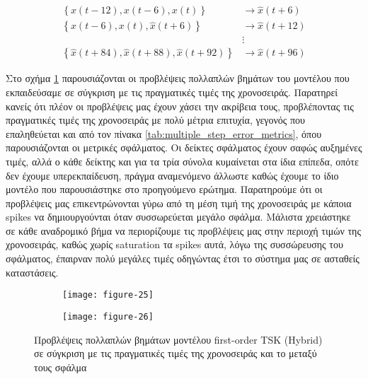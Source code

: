 \documentclass[11pt,a4paper,titlepage, oneside]{article}
\newlength\figureheight
\newlength\figurewidth
\begin{document}
		\begin{align*}
			\left\{ x(t-12), x(t-6), x(t)\right\} & \rightarrow \hat{x}(t+6) \\
			\left\{ x(t-6), x(t), \hat{x}(t+6) \right\} & \rightarrow \hat{x}(t+12) \\
			& \vdots \\
			\left\{ \hat{x}(t+84), \hat{x}(t+88), \hat{x}(t+92) \right\} & \rightarrow \hat{x}(t+96)
		\end{align*}

 		Στο σχήμα \ref{fig:multiple_step_predictions} παρουσιάζονται οι προβλέψεις πολλαπλών βημάτων του μοντέλου που εκπαιδεύσαμε σε σύγκριση με τις πραγματικές τιμές της χρονοσειράς. Παρατηρεί κανείς ότι πλέον οι προβλέψεις μας έχουν χάσει την ακρίβεια τους, προβλέποντας τις πραγματικές τιμές της χρονοσειράς με πολύ μέτρια επιτυχία, γεγονός που επαληθεύεται και από τον πίνακα \ref{tab:multiple_step_error_metrics}, όπου παρουσιάζονται οι μετρικές σφάλματος. Οι δείκτες σφάλματος έχουν σαφώς αυξημένες τιμές, αλλά ο κάθε δείκτης και για τα τρία σύνολα κυμαίνεται στα ίδια επίπεδα, οπότε δεν έχουμε υπερεκπαίδευση, πράγμα αναμενόμενο άλλωστε καθώς έχουμε το ίδιο μοντέλο που παρουσιάστηκε στο προηγούμενο ερώτημα. Παρατηρούμε ότι οι προβλέψεις μας επικεντρώνονται γύρω από τη μέση τιμή της χρονοσειράς με κάποια spikes να δημιουργούνται όταν συσσωρεύεται μεγάλο σφάλμα. Μάλιστα χρειάστηκε σε κάθε αναδρομικό βήμα να περιορίζουμε τις προβλέψεις μας στην περιοχή τιμών της χρονοσειράς, καθώς χωρίς saturation τα spikes αυτά, λόγω της συσσώρευσης του σφάλματος, έπαιρναν πολύ μεγάλες τιμές οδηγώντας έτσι το σύστημα μας σε ασταθείς καταστάσεις.

 		\begin{figure}[]
			 	\setlength{}
				\setlength{}	
				\centering
				\begin{subfigure}[b]{0.49\textwidth}
					\texttt{[image: figure-25]}
				\end{subfigure}
				\begin{subfigure}[b]{0.49\textwidth}
					\texttt{[image: figure-26]}
				\end{subfigure}
				\caption{Προβλέψεις πολλαπλών βημάτων μοντέλου first-order TSK (Hybrid) σε σύγκριση με τις πραγματικές τιμές της χρονοσειράς και το μεταξύ τους σφάλμα}
				\label{fig:multiple_step_predictions}
		\end{figure}
			
\end{document}
